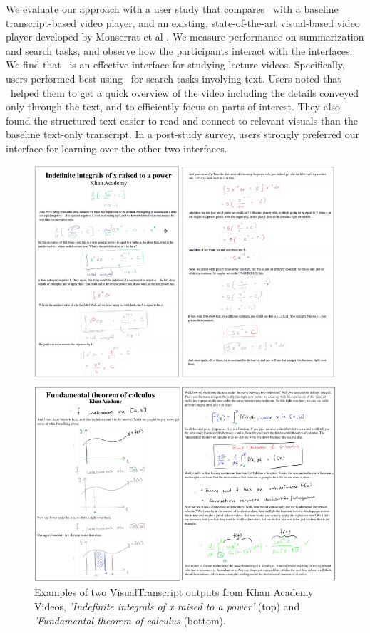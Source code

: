 We evaluate our approach with a user study that compares \systemname\ with a baseline transcript-based video player, and an existing, state-of-the-art visual-based video player developed by Monserrat et al \cite{monserrat2013notevideo}. We measure performance on summarization and search tasks, and observe how the participants interact with the interfaces. We find that \systemname\ is an effective interface for studying lecture videos. Specifically, users performed best using \systemname\ for search tasks involving text. Users noted that \systemname\ helped them to get a quick overview of the video including the details conveyed only through the text, and to efficiently focus on parts of interest. They also found the structured text easier to read and connect to relevant visuals than the baseline text-only transcript. In a post-study survey, users strongly preferred our interface for learning over the other two interfaces.\\
\begin{figure}[t!]
    \centering
        \includegraphics[width=\textwidth]{figures/videonote_example.pdf}
    \caption{Examples of two VisualTranscript outputs from Khan Academy Videos, \textit{'Indefinite integrals of x raised to a power'} (top) and \textit{'Fundamental theorem of calculus} (bottom).}
    \label{Fig:videonote_example}
\end{figure}
%

